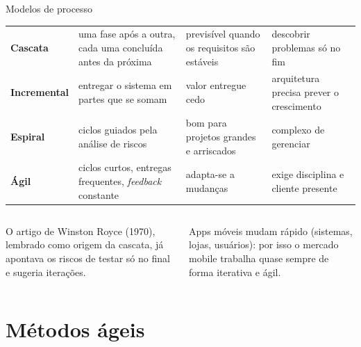 \documentclass[aspectratio=169,10pt]{beamer}
\begin{document}
\begin{frame}{Modelos de processo}
  \scriptsize
  \begin{tabularx}{\textwidth}{@{}p{2.6cm} L L L@{}}
    \toprule
     &  &  &  \\
    \midrule
    \textbf{Cascata} & uma fase após a outra, cada uma concluída antes da próxima & previsível quando os requisitos são estáveis & descobrir problemas só no fim \\
    \textbf{Incremental} & entregar o sistema em partes que se somam & valor entregue cedo & arquitetura precisa prever o crescimento \\
    \textbf{Espiral} & ciclos guiados pela análise de riscos & bom para projetos grandes e arriscados & complexo de gerenciar \\
    \textbf{Ágil} & ciclos curtos, entregas frequentes, \emph{feedback} constante & adapta-se a mudanças & exige disciplina e cliente presente \\
    \bottomrule
  \end{tabularx}
  \vspace{4pt}
  \begin{columns}[T]
    \begin{column}{0.48\textwidth}
      \begin{historia}
        O artigo de Winston Royce (1970), lembrado como origem da cascata, já apontava os riscos de testar só no final e sugeria iterações.
      \end{historia}
    \end{column}
    \begin{column}{0.48\textwidth}
      \begin{dica}
        Apps móveis mudam rápido (sistemas, lojas, usuários): por isso o mercado mobile trabalha quase sempre de forma iterativa e ágil.
      \end{dica}
    \end{column}
  \end{columns}
\end{frame}

\section{Métodos ágeis}
\end{document}
